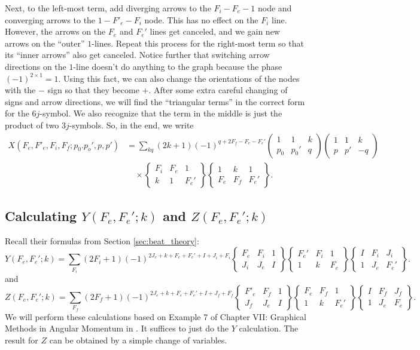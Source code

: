 \documentclass[11pt]{article}
\newcommand{\tj}[6]{ \begin{pmatrix}
		#1 & #2 & #3 \\
		#4 & #5 & #6 
\end{pmatrix}}
\newcommand{\Gj}[6]{ \begin{Bmatrix}
		#1 & #2 & #3 \\
		#4 & #5 & #6 
\end{Bmatrix}}
\begin{document}
Next, to the left-most term, add diverging arrows to the $F_i-F_e-1$ node and converging arrows to the $1-F'_e-F_i$ node. This has no effect on the $F_i$ line. However, the arrows on the $F_e$ and $F_e'$ lines get canceled, and we gain new arrows on the ``outer'' $1$-lines. Repeat this process for the right-most term so that its ``inner arrows''  also get canceled. Notice further that switching arrow directions on the $1$-line doesn't do anything to the graph because the phase $(-1)^{2\times 1} = 1$. Using this fact, we can also change the orientations of the nodes with the $-$ sign so that they become $+$. After some extra careful changing of signs and arrow directions, we will find the ``triangular terms'' in the correct form for the $6j$-symbol. We also recognize that the term in the middle is just the product of two $3j$-symbols. So, in the end, we write
\begin{align*}
X(F_e,F'_e,F_i,F_f;p_0.p_o',p,p') &= \sum_{kq} (2k+1) (-1)^{q + 2F_f - F_e - F_e'}\tj{1}{1}{k}{p_0}{p_0'}{q}\tj{1}{1}{k}{p}{p'}{-q}  \\
&\quad\times \Gj{F_i}{F_e}{1}{k}{1}{F_e'} \Gj{1}{k}{1}{F_e}{F_f}{F_e'}.
\end{align*}

\subsection{Calculating $Y(F_e, F_e';k)$ and $Z(F_e, F_e';k)$} \label{app:YZ}
Recall their formulas from Section \ref{sec:beat_theory}:
\begin{equation*}
Y(F_e, F_e';k) = \sum_{F_i}(2F_i + 1)(-1)^{2J_e + k + F_e + F_e' + I + J_i + F_i}
\Gj{F_e}{F_i}{1}{J_i}{J_e}{I}
\Gj{F_e'}{F_i}{1}{1}{k}{F_e}
\Gj{I}{F_i}{J_i}{1}{J_e}{F_e'}.
\end{equation*}
and
\begin{equation*}
Z(F_e, F_e';k) = \sum_{F_f}(2F_f + 1)(-1)^{2J_e + k + F_e + F_e' + I + J_f + F_f}
\Gj{F'_e}{F_f}{1}{J_f}{J_e}{I}
\Gj{F_e}{F_f}{1}{1}{k}{F_e'}
\Gj{I}{F_f}{J_f}{1}{J_e}{F_e}.
\end{equation*}
We will perform these calculations based on Example 7 of Chapter VII: Graphical Methods in Angular Momentum in \cite{angular_momentum}. It suffices to just do the $Y$ calculation. The result for $Z$ can be obtained by a simple change of variables.





\end{document}
